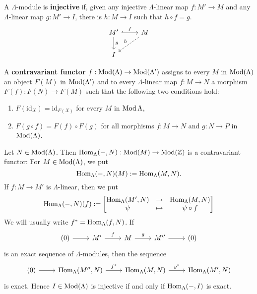 \begin{definition}
A $\Lambda$-module is \textbf{injective} if, given any injective $\Lambda$-linear map $f:M'\to M$ and any $\Lambda$-linear map $g:M'\to I$, there is $h:M\to I$ such that $h\circ f=g$.
%
\[
\begin{tikzcd}
	M' \ar[r,hook,"f"] \ar[d,"g"] & M \ar[ld,dashed,"h"'] \\
	I
\end{tikzcd}
\]
%
\end{definition}


\begin{definition}
A \textbf{contravariant functor} $f:\operatorname{Mod}(\Lambda)\to\operatorname{Mod}(\Lambda')$ assigns to every $M$ in $\operatorname{Mod}(\Lambda)$ an object $F(M)$ in $\operatorname{Mod}(\Lambda')$ and to every $\Lambda$-linear map $f:M\to N$ a morphism $F(f):F(N)\to F(M)$ such that the following two conditions hold:
\begin{enumerate}[label=(\alph*)]
\item $F(\mathrm {id} _{X})=\mathrm {id} _{F(X)}$ for every $M$ in $\operatorname{Mod} \Lambda$,
\item $F(g\circ f)=F(f)\circ F(g)$ for all morphisms $f:M\rightarrow N$ and $g:N\rightarrow P$ in $\operatorname{Mod}(\Lambda)$.
\end{enumerate}
\end{definition}


\begin{example}
Let $N\in\operatorname{Mod}(\Lambda)$. Then $\operatorname{Hom}_\Lambda(-,N):\operatorname{Mod}(M)\to\operatorname{Mod}(\mathbb{Z})$ is a contravariant functor: For $M\in \operatorname{Mod}(\Lambda)$, we put
\[
\operatorname{Hom}_\Lambda(-,N)(M) := \operatorname{Hom}_\Lambda(M,N).
\]
If $f:M\to M'$ is $\Lambda$-linear, then we put
\[
\operatorname{Hom}_\Lambda(-,N)(f) :=
\begin{bmatrix}
\operatorname{Hom}_\Lambda(M',N) & \to & \operatorname{Hom}_\Lambda(M,N) \\
\psi & \mapsto & \psi \circ f
\end{bmatrix}
\]
We will usually write $f^*=\operatorname{Hom}_\Lambda(f,N)$. If
\[
\begin{tikzcd}
	(0) \ar[r] & M' \ar[r,"f"] & M \ar[r,"g"] & M'' \ar[r] & (0)
\end{tikzcd}
\]
is an exact sequence of $\Lambda$-modules, then the sequence
\[
\begin{tikzcd}
(0) \ar[r] & \Hom_\Lambda(M'',N) \ar[r,"f^*"] & \Hom_\Lambda(M,N) \ar[r,"g^*"] & \Hom_\Lambda(M',N)
\end{tikzcd}
\]
is exact. Hence $I\in \operatorname{Mod}(\Lambda)$ is injective if and only if $\operatorname{Hom}_\Lambda(-,I)$ is exact.
\end{example}

